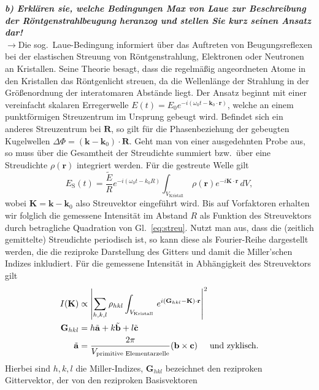 \textbf{\textit{b) Erklären sie, welche Bedingungen Max von Laue zur Beschreibung der
Röntgenstrahlbeugung heranzog und stellen Sie kurz seinen Ansatz dar!}}\\
$\rightarrow$Die sog.~Laue-Bedingung informiert über das Auftreten von Beugungsreflexen bei der elastischen Streuung von 
Röntgenstrahlung, Elektronen oder Neutronen an Kristallen. Seine Theorie besagt, dass die regelmäßig angeordneten Atome in den 
Kristallen das Röntgenlicht streuen, da die Wellenlänge der Strahlung in der Größenordnung der interatomaren Abstände liegt. 
Der Ansatz beginnt mit einer vereinfacht skalaren Erregerwelle $E(t) = E_{0}e^{-i(\omega_{0}t-\mathbf{k}_{0}\cdot \mathbf{r})}$, 
welche an einem punktförmigen Streuzentrum im Ursprung gebeugt wird. Befindet sich ein anderes Streuzentrum bei $\mathbf{R}$, so gilt 
für die Phasenbeziehung der gebeugten Kugelwellen $\Delta\Phi = (\mathbf{k} - \mathbf{k}_{0})\cdot \mathbf{R}$. Geht man von einer 
ausgedehnten Probe aus, so muss über die Gesamtheit der Streudichte summiert bzw.~über eine Streudichte $\rho(\mathbf{r})$ integriert werden.
Für die gestreute Welle gilt
\begin{equation}\label{eq:streu}
    E_{\text{S}}(t) = \frac{\tilde{E}}{R}e^{-i(\omega_{0}t-k_{0}R)}\int_{V_{\text{Kristall}}}\,\rho(\mathbf{r})e^{-i \mathbf{K}\cdot \mathbf{r}}\,dV,
\end{equation}
wobei $\mathbf{K} = \mathbf{k} - \mathbf{k}_{0}$ also Streuvektor eingeführt wird. Bis auf Vorfaktoren erhalten wir folglich die gemessene Intensität 
im Abstand $R$ als Funktion des Streuvektors durch betragliche Quadration von Gl.~\eqref{eq:streu}. Nutzt man aus, dass die (zeitlich gemittelte) Streudichte
periodisch ist, so kann diese als Fourier-Reihe dargestellt werden, die die reziproke Darstellung des Gitters und damit die Miller'schen Indizes inkludiert. 
Für die gemessene Intensität in Abhängigkeit des Streuvektors gilt
\begin{align}
    I(\mathbf{K}) &\propto \left\vert\sum_{h,k,l}\rho_{hkl}\int_{V_{\text{Kristall}}}\,e^{i(\mathbf{G}_{hkl}-\mathbf{K})\cdot\mathbf{r}}\right\vert^{2} \label{eq:laue}\\
    \mathbf{G}_{hkl} &= h\tilde{\mathbf{a}} + k\tilde{\mathbf{b}} + l\tilde{\mathbf{c}} \\
    \tilde{\mathbf{a}} &= \frac{2\pi}{V_{\text{primitive Elementarzelle}}}(\mathbf{b}\times \mathbf{c})\hspace{0.5cm}\text{und zyklisch}.
\end{align}
Hierbei sind $h,k,l$ die Miller-Indizes, $\mathbf{G}_{hkl}$ bezeichnet den reziproken Gittervektor, der von den reziproken Basisvektoren 
